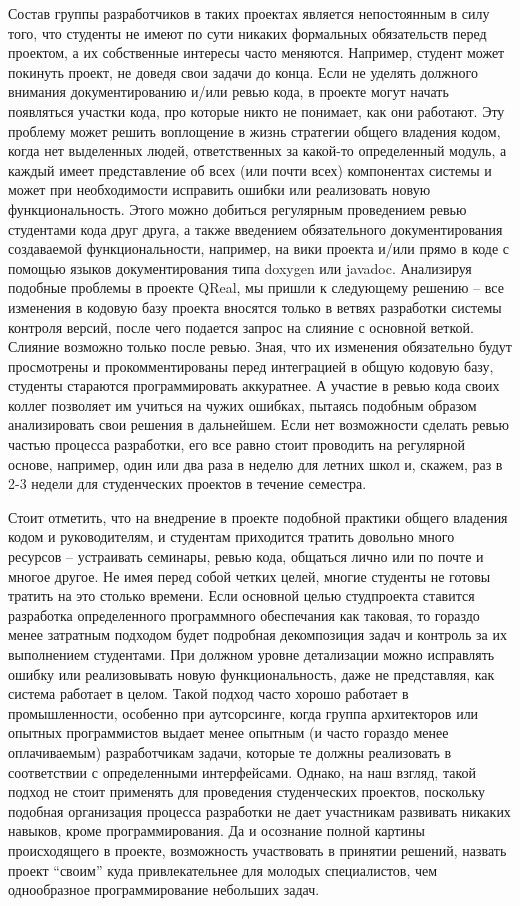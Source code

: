 \documentclass[a4paper]{article}
\begin{document}
Состав группы разработчиков в таких проектах является непостоянным в силу того, что студенты не имеют по сути никаких формальных обязательств перед проектом, а их собственные интересы часто меняются. Например, студент может покинуть проект, не доведя свои задачи до конца. Если не уделять должного внимания документированию и/или ревью кода, в проекте могут начать появляться участки кода, про которые никто не понимает, как они работают. Эту проблему может решить воплощение в жизнь стратегии общего владения кодом, когда нет выделенных людей, ответственных за какой-то определенный модуль, а каждый имеет представление об всех (или почти всех) компонентах системы и может при необходимости исправить ошибки или реализовать новую функциональность. Этого можно добиться регулярным проведением ревью студентами кода друг друга, а также введением обязательного документирования создаваемой функциональности, например, на вики проекта и/или прямо в коде с помощью языков документирования типа doxygen или javadoc. Анализируя подобные проблемы в проекте QReal, мы пришли к следующему решению -- все изменения в кодовую базу проекта вносятся только в ветвях разработки системы контроля версий, после чего подается запрос на слияние с основной веткой. Слияние возможно только после ревью. Зная, что их изменения обязательно будут просмотрены и прокомментированы перед интеграцией в общую кодовую базу, студенты стараются программировать аккуратнее. А участие в ревью кода своих коллег позволяет им учиться на чужих ошибках, пытаясь подобным образом анализировать свои решения в дальнейшем. Если нет возможности сделать ревью частью процесса разработки, его все равно стоит проводить на регулярной основе, например, один или два раза в неделю для летних школ и, скажем, раз в 2-3 недели для студенческих проектов в течение семестра.

Стоит отметить, что на внедрение в проекте подобной практики общего владения кодом и руководителям, и студентам приходится тратить довольно много ресурсов -- устраивать семинары, ревью кода, общаться лично или по почте и многое другое. Не имея перед собой четких целей, многие студенты не готовы тратить на это столько времени. Если основной целью студпроекта ставится разработка определенного программного обеспечания как таковая, то гораздо менее затратным подходом будет подробная декомпозиция задач и контроль за их выполнением студентами.  При должном уровне детализации можно исправлять ошибку или реализовывать новую функциональность, даже не представляя, как система работает в целом. Такой подход часто хорошо работает в промышленности, особенно при аутсорсинге, когда группа архитекторов или опытных программистов выдает менее опытным (и часто гораздо менее оплачиваемым) разработчикам задачи, которые те должны реализовать в соответствии с определенными интерфейсами. Однако, на наш взгляд, такой подход не стоит применять для проведения студенческих проектов, поскольку подобная организация процесса разработки не дает участникам развивать никаких навыков, кроме программирования. Да и осознание полной картины происходящего в проекте, возможность участвовать в принятии решений, назвать проект ``своим'' куда привлекательнее для молодых специалистов, чем однообразное программирование небольших задач. 
\end{document}
